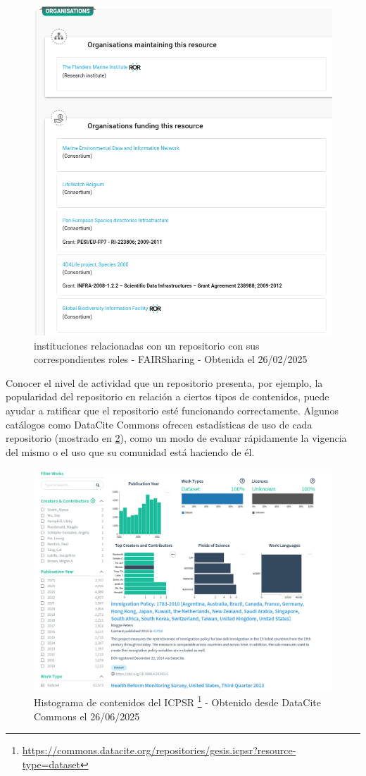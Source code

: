 \documentclass[runningheads]{llncs}
\begin{document}
\begin{figure}
    \centering
    \includegraphics[width=0.5\linewidth]{fairsharing_institutions.png}
    \caption{instituciones relacionadas con un repositorio con sus correspondientes roles - FAIRSharing - Obtenida el 26/02/2025}
    \label{fig:fairsharing_institutions}
\end{figure}

Conocer el nivel de actividad que un repositorio presenta,  por ejemplo, la popularidad del repositorio en relación a ciertos tipos de contenidos, puede ayudar a ratificar que el repositorio esté funcionando correctamente. Algunos catálogos como DataCite Commons ofrecen estadísticas de uso de cada repositorio (mostrado en \ref{fig:datacite_commons_histograma}), como un modo de evaluar rápidamente la vigencia del mismo o el uso que su comunidad está haciendo de él.\\

\begin{figure}
    \centering
    \includegraphics[width=0.5\linewidth]{datacite_commons_histograma.png}
    \caption{Histograma de contenidos del ICPSR 
    \footnote{\url{https://commons.datacite.org/repositories/gesis.icpsr?resource-type=dataset}}
    - Obtenido desde DataCite Commons el 26/06/2025}
    \label{fig:datacite_commons_histograma}
\end{figure}
\end{document}
